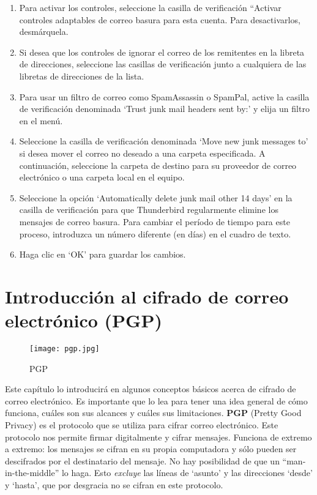 \documentclass[10pt,a5paper,twoside,,]{book}
\begin{document}
\begin{enumerate}
\def\labelenumi{\arabic{enumi}.}
\setcounter{enumi}{3}
\item
  Para activar los controles, seleccione la casilla de verificación
  ``Activar controles adaptables de correo basura para esta cuenta. Para
  desactivarlos, desmárquela.
\item
  Si desea que los controles de ignorar el correo de los remitentes en
  la libreta de direcciones, seleccione las casillas de verificación
  junto a cualquiera de las libretas de direcciones de la lista.
\item
  Para usar un filtro de correo como SpamAssassin o SpamPal, active la
  casilla de verificación denominada `Trust junk mail headers sent by:'
  y elija un filtro en el menú.
\item
  Seleccione la casilla de verificación denominada `Move new junk
  messages to' si desea mover el correo no deseado a una carpeta
  especificada. A continuación, seleccione la carpeta de destino para su
  proveedor de correo electrónico o una carpeta local en el equipo.
\item
  Seleccione la opción `Automatically delete junk mail other 14 days' en
  la casilla de verificación para que Thunderbird regularmente elimine
  los mensajes de correo basura. Para cambiar el período de tiempo para
  este proceso, introduzca un número diferente (en días) en el cuadro de
  texto.
\item
  Haga clic en `OK' para guardar los cambios.
\end{enumerate}

\chapter{Introducción al cifrado de correo electrónico
(PGP)}\label{introducciuxf3n-al-cifrado-de-correo-electruxf3nico-pgp}

\begin{figure}[htbp]
\centering
\texttt{[image: pgp.jpg]}
\caption{PGP}
\end{figure}

Este capítulo lo introducirá en algunos conceptos básicos acerca de
cifrado de correo electrónico. Es importante que lo lea para tener una
idea general de cómo funciona, cuáles son sus alcances y cuáles sus
limitaciones. \textbf{PGP} (Pretty Good Privacy) es el protocolo que se
utiliza para cifrar correo electrónico. Este protocolo nos permite
firmar digitalmente y cifrar mensajes. Funciona de extremo a extremo:
los mensajes se cifran en su propia computadora y sólo pueden ser
descifrados por el destinatario del mensaje. No hay posibilidad de que
un ``man-in-the-middle'' lo haga. Esto \emph{excluye} las líneas de
`asunto' y las direcciones `desde' y `hasta', que por desgracia no se
cifran en este protocolo.
\end{document}
